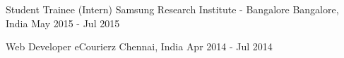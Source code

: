 \begin{cventries}
  \cventry
    {Student Trainee (Intern)} %
    {Samsung Research Institute - Bangalore} %
    {Bangalore, India} %
    {May 2015 - Jul 2015} %
    {
    }

  \cventry
    {Web Developer} %
    {eCourierz} %
    {Chennai, India} %
    {Apr 2014 - Jul 2014} %
    {
    }

\end{cventries}
